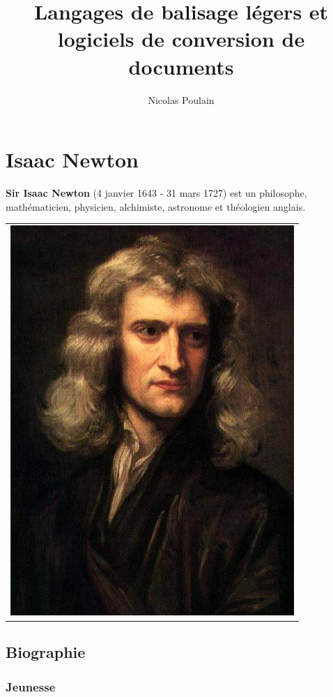 \documentclass{article}
\title{Langages de balisage légers et logiciels de conversion de documents}
\author{Nicolas Poulain}
\begin{document}
\clearpage


\section*{Isaac Newton}

\textbf{Sir Isaac Newton} (4 janvier 1643 - 31 mars 1727) est un philosophe,
mathématicien, physicien, alchimiste, astronome et théologien anglais.

\begin{center}\begin{tabular}{l}
\includegraphics[scale=0.3]{newton_portrait.jpg} \\
\end{tabular}\end{center}

\subsection*{Biographie}

\subsubsection*{Jeunesse}
\end{document}
